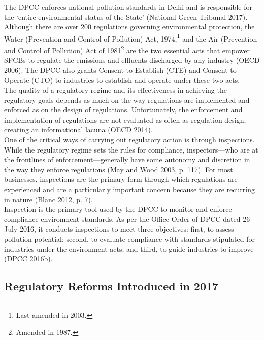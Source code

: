 \documentclass[a4paper, 12pt]{article}
\begin{document}
                 The DPCC enforces national pollution standards in Delhi and is responsible for the ‘entire environmental status of the State’ (National Green Tribunal 2017). \\
                 
                 Although there are over 200 regulations governing environmental protection, the Water (Prevention and Control of Pollution) Act, 1974,\footnote{Last amended in 2003.} and the Air (Prevention and Control of Pollution) Act of 1981\footnote{Amended in 1987.} are the two essential acts that empower SPCBs to regulate the emissions and effluents discharged by any industry (OECD 2006). The DPCC also grants Consent to Establish (CTE) and Consent to Operate (CTO) to industries to establish and operate under these two acts. \\
                 
                 The quality of a regulatory regime and its effectiveness in achieving the regulatory goals depends as much on the way regulations are implemented and enforced as on the design of regulations. Unfortunately, the enforcement and implementation of regulations are not evaluated as often as regulation design, creating an informational lacuna (OECD 2014). \\
                 
                 One of the critical ways of carrying out regulatory action is through inspections. While the regulatory regime sets the rules for compliance, inspectors—who are at the frontlines of enforcement—generally have some autonomy and discretion in the way they enforce regulations (May and Wood 2003, p. 117). For most businesses, inspections are the primary form through which regulations are experienced and are a particularly important concern because they are recurring in nature (Blanc 2012, p. 7). \\
                 
                 Inspection is the primary tool used by the DPCC to monitor and enforce compliance environment standards. As per the Office Order of DPCC dated 26 July 2016, it conducts inspections to meet three objectives: first, to assess pollution potential; second, to evaluate compliance with standards stipulated for industries under the environment acts; and third, to guide industries to improve (DPCC 2016b). \\
                 
                 \subsection{Regulatory Reforms Introduced in 2017}
                 
\end{document}
